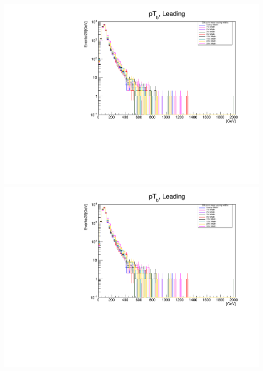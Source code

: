 \documentclass[a4wide,10pt]{article}
\begin{document}
\includegraphics[scale=0.50,page=13]{../Pdfs/Leading_b_TranverseMomentum_VaryingWidths.pdf}
\includegraphics[scale=0.50,page=14]{../Pdfs/Leading_b_TranverseMomentum_VaryingWidths.pdf}
\end{document}
